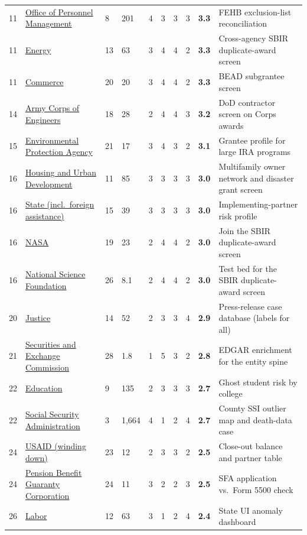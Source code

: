 \documentclass[letterpaper,11pt]{article}
\begin{document}
\begin{longtable}[l]{@{}l>{\raggedright\arraybackslash}p{}lllllll>{\raggedright\arraybackslash}p{}@{}}
11 & \href{opm.pdf}{Office of Personnel Management} & 8 & 201 & 4 & 3 & 3 & 3 & \textbf{3.3} & FEHB exclusion-list reconciliation \\
11 & \href{doe.pdf}{Energy} & 13 & 63 & 3 & 4 & 4 & 2 & \textbf{3.3} & Cross-agency SBIR duplicate-award screen \\
11 & \href{doc.pdf}{Commerce} & 20 & 20 & 3 & 4 & 4 & 2 & \textbf{3.3} & BEAD subgrantee screen \\
14 & \href{usace.pdf}{Army Corps of Engineers} & 18 & 28 & 2 & 4 & 4 & 3 & \textbf{3.2} & DoD contractor screen on Corps awards \\
15 & \href{epa.pdf}{Environmental Protection Agency} & 21 & 17 & 3 & 4 & 3 & 2 & \textbf{3.1} & Grantee profile for large IRA programs \\
16 & \href{hud.pdf}{Housing and Urban Development} & 11 & 85 & 3 & 3 & 3 & 3 & \textbf{3.0} & Multifamily owner network and disaster grant screen \\
16 & \href{state.pdf}{State (incl.~foreign assistance)} & 15 & 39 & 3 & 3 & 3 & 3 & \textbf{3.0} & Implementing-partner risk profile \\
16 & \href{nasa.pdf}{NASA} & 19 & 23 & 2 & 4 & 4 & 2 & \textbf{3.0} & Join the SBIR duplicate-award screen \\
16 & \href{nsf.pdf}{National Science Foundation} & 26 & 8.1 & 2 & 4 & 4 & 2 & \textbf{3.0} & Test bed for the SBIR duplicate-award screen \\
20 & \href{doj.pdf}{Justice} & 14 & 52 & 2 & 3 & 3 & 4 & \textbf{2.9} & Press-release case database (labels for all) \\
21 & \href{sec.pdf}{Securities and Exchange Commission} & 28 & 1.8 & 1 & 5 & 3 & 2 & \textbf{2.8} & EDGAR enrichment for the entity spine \\
22 & \href{ed.pdf}{Education} & 9 & 135 & 2 & 3 & 3 & 3 & \textbf{2.7} & Ghost student risk by college \\
22 & \href{ssa.pdf}{Social Security Administration} & 3 & 1,664 & 4 & 1 & 2 & 4 & \textbf{2.7} & County SSI outlier map and death-data case \\
24 & \href{usaid.pdf}{USAID (winding down)} & 23 & 12 & 2 & 3 & 3 & 2 & \textbf{2.5} & Close-out balance and partner table \\
24 & \href{pbgc.pdf}{Pension Benefit Guaranty Corporation} & 24 & 11 & 3 & 2 & 2 & 3 & \textbf{2.5} & SFA application vs.~Form 5500 check \\
26 & \href{dol.pdf}{Labor} & 12 & 63 & 3 & 1 & 2 & 4 & \textbf{2.4} & State UI anomaly dashboard \\

\end{longtable}
\end{document}

